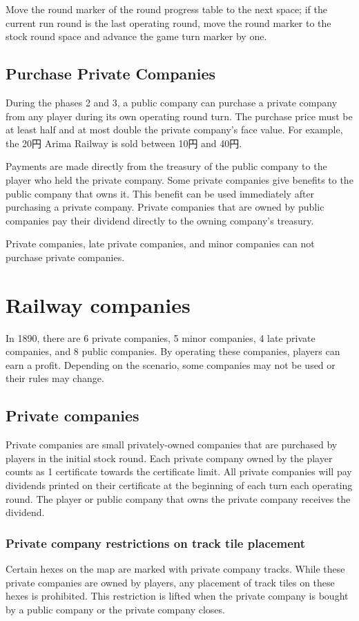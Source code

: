 \documentclass{article}
\begin{document}
\begin{CJK}{UTF8}{min}
\begin{multicols}{2}
Move the round marker of the round progress table to the next space;
if the current run round is the last operating round, move the round marker
to the stock round space and advance the game turn marker by one.

\subsection{Purchase Private Companies}
\label{or-private-purchase}
During the phases 2 and 3, a public company can purchase a private
company from any player during its own operating round turn.  The
purchase price must be at least half and at most double the private
company's face value. For example, the 20円 Arima Railway is sold
between 10円 and 40円.

Payments are made directly from the treasury of the public company to
the player who held the private company. Some private companies give
benefits to the public company that owns it. This benefit can be used
immediately after purchasing a private company. Private companies that
are owned by public companies pay their dividend directly to the
owning company's treasury.

Private companies, late private companies, and minor companies can
not purchase private companies.


\section{Railway companies}
In 1890, there are 6 private companies, 5 minor companies, 4 late private
companies, and 8 public companies. By operating these companies,
players can earn a profit. Depending on the scenario, some companies
may not be used or their rules may change.

\subsection{Private companies}
Private companies are small privately-owned companies that are
purchased by players in the initial stock round. Each private company
owned by the player counts as 1 certificate towards the certificate
limit. All private companies will pay dividends printed on their
certificate at the beginning of each turn each operating round. The
player or public company that owns the private company receives the
dividend.

\subsubsection{Private company restrictions on track tile placement}
Certain hexes on the map are marked with private company tracks. While
these private companies are owned by players, any placement of track
tiles on these hexes is prohibited. This restriction is lifted when
the private company is bought by a public company or the private
company closes.


\end{multicols}
\end{CJK}
\end{document}

